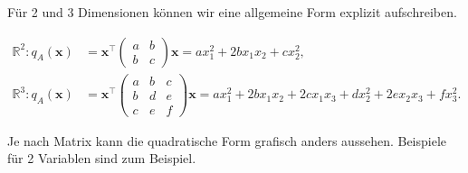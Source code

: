 Für 2 und 3 Dimensionen können wir eine allgemeine Form explizit aufschreiben. 

\begin{equation*}
    \begin{aligned}
        \mathbb{R}^2: q_A(\mathbf{x}) &= \mathbf{x}^\top \begin{pmatrix} a & b \\ b & c \end{pmatrix} \mathbf{x} = ax_1^2 + 2bx_1x_2 + cx_2^2, \\[1em]
        \mathbb{R}^3: q_A(\mathbf{x}) &= \mathbf{x}^\top \begin{pmatrix} a & b & c \\ b & d & e \\ c & e & f \end{pmatrix} \mathbf{x} = ax_1^2 + 2bx_1x_2 + 2cx_1x_3 + dx_2^2 + 2ex_2x_3 + fx_3^2.
    \end{aligned}
\end{equation*}

\vspace{0.25\baselineskip}

Je nach Matrix kann die quadratische Form grafisch anders aussehen. Beispiele für 2 Variablen sind zum Beispiel.

